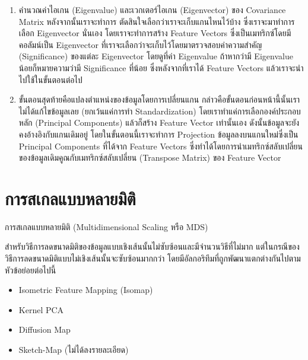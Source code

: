 \begin{enumerate}
    \item คำนวณค่าไอเกน (Eigenvalue) และเวกเตอร์ไอเกน (Eigenvector) ของ Covariance Matrix หลังจากนั้นเราจะทำการ%
    ตัดสินใจเลือกว่าเราจะเก็บแกนไหนไว้บ้าง ซึ่งเราจะมาทำการเลือก Eigenvector นั่นเอง โดยเราจะทำการสร้าง Feature Vectors 
    ซึ่งเป็นเมทริกซ์โดยมีคอลัมน์เป็น Eigenvector ที่เราจะเลือกว่าจะเก็บไว้โดยมาตรวจสอบค่าความสำคัญ (Significance) ของแต่ละ 
    Eigenvector โดยดูที่ค่า Eigenvalue ถ้าหากว่ามี Eigenvalue น้อยก็หมายความว่ามี Significance ที่น้อย ซึ่งหลังจากที่เราได้ 
    Feature Vectors แล้วเราจะนำไปใช้ในขั้นตอนต่อไป

    \item ขั้นตอนสุดท้ายคือแปลงตำแหน่งของข้อมูลโดยการเปลี่ยนแกน กล่าวคือขั้นตอนก่อนหน้านี้นั้นเราไม่ได้แก้ไขข้อมูลเลย (ยกเว้นแค่การทำ 
    Standardization) โดยเราทำแค่การเลือกองค์ประกอบหลัก (Principal Components) แล้วก็สร้าง Feature Vector เท่านั้นเอง 
    ดังนั้นข้อมูลจะยังคงอ้างอิงกับแกนเดิมอยู่ โดยในขั้นตอนนี้เราจะทำการ Projection ข้อมูลลงบนแกนใหม่ซึ่งเป็น Principal Components 
    ที่ได้จาก Feature Vectors ซึ่งทำได้โดยการนำเมทริกซ์สลับเปลี่ยนของข้อมูลเดิมคูณกับเมทริกซ์สลับเปลี่ยน (Transpose Matrix) ของ 
    Feature Vector

\end{enumerate}

\section{การสเกลแบบหลายมิติ}
\label{sec:mds}

การสเกลแบบหลายมิติ (Multidimensional Scaling หรือ MDS)\autocite{young1938,torgerson1952}

สำหรับวิธีการลดขนาดมิติของข้อมูลแบบเชิงเส้นนั้นไม่ซับซ้อนและมีจำนวนวิธีที่ไม่มาก แต่ในกรณีของวิธีการลดขนาดมิติแบบไม่เชิงเส้นนั้นจะซับซ้อนมากกว่า
โดยมีอัลกอริทึมที่ถูกพัฒนาแตกต่างกันไปตามหัวข้อย่อยต่อไปนี้\autocite{glielmo2021}

\begin{itemize}[topsep=0pt]
    \item Isometric Feature Mapping (Isomap)
    
    \item Kernel PCA
    
    \item Diffusion Map
    
    \item Sketch-Map (ไม่ได้ลงรายละเอียด)
\end{itemize}

